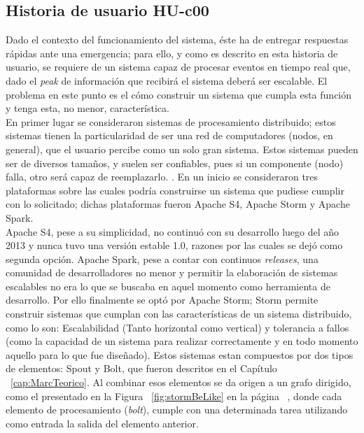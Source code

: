 \subsection{Historia de usuario HU-c00}
\label{subsec:HU-c00}

Dado el contexto del funcionamiento del sistema, éste ha de entregar respuestas rápidas ante una emergencia; para ello, y como es descrito en esta historia de usuario, se requiere de un sistema capaz de procesar eventos en tiempo real que, dado el \textit{peak} de información que recibirá el sistema deberá ser escalable. El problema en este punto es el cómo construir un sistema que cumpla esta función y tenga esta, no menor, característica.\\

En primer lugar se consideraron sistemas de procesamiento distribuido; estos sistemas tienen la particularidad de ser una red de computadores (nodos, en general), que el usuario percibe como un solo gran sistema. Estos sistemas pueden ser de diversos tamaños, y suelen ser confiables, pues si un componente (nodo) falla, otro será capaz de reemplazarlo. \cite{DefSPD}. En un inicio se consideraron tres plataformas sobre las cuales podría construirse un sistema que pudiese cumplir con lo solicitado; dichas plataformas fueron Apache S4, Apache Storm y Apache Spark.\\

Apache S4, pese a su simplicidad, no continuó con su desarrollo luego del año 2013 y nunca tuvo una versión estable 1.0, razones por las cuales se dejó como segunda opción. Apache Spark, pese a contar con continuos \textit{releases}, una comunidad de desarrolladores no menor y permitir la elaboración de sistemas escalables no era lo que se buscaba en aquel momento como herramienta de desarrollo. Por ello finalmente se optó por Apache Storm; Storm permite construir sistemas que cumplan con las características de un sistema distribuido, como lo son: Escalabilidad (Tanto horizontal como vertical) y tolerancia a fallos (como la capacidad de un sistema para realizar correctamente y en todo momento aquello para lo que fue diseñado). Estos sistemas estan compuestos por dos tipos de elementos: Spout y Bolt, que fueron descritos en el Capítulo ~\ref{cap:MarcTeorico}. Al combinar esos elementos se da origen a un grafo dirigido, como el presentado en la Figura ~\ref{fig:stormBeLike} en la página ~\pageref{fig:stormBeLike}, donde cada elemento de procesamiento (\textit{bolt}), cumple con una determinada tarea utilizando como entrada la salida del elemento anterior.\\


